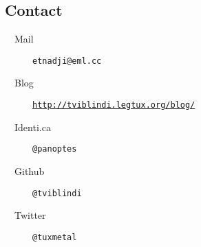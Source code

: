 \subsection*{Contact}

  \begin{description}
    \item[~~Mail] \texttt{etnadji@eml.cc}
    \item[~~Blog] \href{http://tviblindi.legtux.org/blog/}{\texttt{http://tviblindi.legtux.org/blog/}}
    \item[~~Identi.ca] \texttt{@panoptes}
    \item[~~Github] \texttt{@tviblindi}
    \item[~~Twitter] \texttt{@tuxmetal}
  \end{description}
